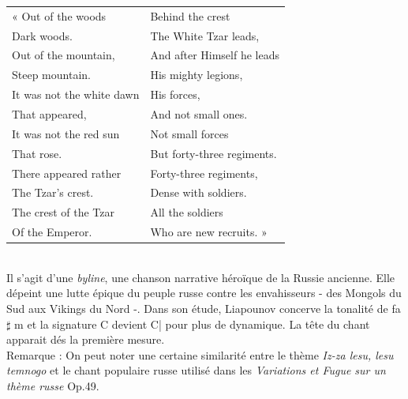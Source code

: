 \begin{tabular}{ll}
\hspace{-3.9mm}« Out of the woods
&
Behind the crest
\\
  \quad{}Dark woods.
&
  \quad{}The White Tzar leads,
\\
Out of the mountain,
&
And after Himself he leads
\\
  \quad{}Steep mountain.
&
  \quad{}His mighty legions,
\\
It was not the white dawn
&
His forces,
\\
  \quad{}That appeared,
&
  \quad{}And not small ones.
\\
It was not the red sun
&
Not small forces
\\
  \quad{}That rose.
&
  \quad{}But forty-three regiments.
\\
There appeared rather
&
Forty-three regiments,
\\
  \quad{}The Tzar’s crest.
&
  \quad{}Dense with soldiers.
\\
The crest of the Tzar
&
All the soldiers
\\
  \quad{}Of the Emperor.
&
  \quad{}Who are new recruits. »
\end{tabular}\\

Il s'agit d'une \emph{byline}, une chanson narrative héroïque de la Russie ancienne. Elle dépeint une lutte épique du peuple russe contre les envahisseurs - des Mongols du Sud aux Vikings du Nord -. Dans son étude, Liapounov concerve la tonalité de fa$\sharp$ m et la signature C devient C\hspace{-2mm}| pour plus de dynamique. La tête du chant apparait dés la première mesure.\\

Remarque : On peut noter une certaine similarité entre le thème \emph{Iz-za lesu, lesu temnogo} et le chant populaire russe utilisé dans les \emph{Variations et Fugue sur un thème russe} Op.49.

